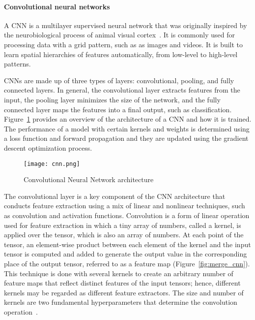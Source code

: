 \paragraph{Convolutional neural networks} 

A \gls{CNN} is a multilayer supervised neural network that was originally inspired by the neurobiological process of animal visual cortex~\cite{Ganatra2018ATools}. It is commonly used for processing data with a grid pattern, such as as images and videos. It is built to learn spatial hierarchies of features automatically, from low-level to high-level patterns. 

\gls{CNN}s are made up of three types of layers: convolutional, pooling, and fully connected layers. In general, the convolutional layer extracts features from the input, the pooling layer minimizes the size of the network, and the fully connected layer maps the features into a final output, such as classification. Figure~\ref{fig:cnn} provides an overview of the architecture of a \gls{CNN} and how it is trained. The performance of a model with certain kernels and weights is determined using a loss function and forward propagation and they are updated using the gradient descent optimization process.

\begin{figure}[htbp]
    \centering
    \texttt{[image: cnn.png]}
    \caption{Convolutional Neural Network architecture~\cite{Yamashita2018ConvolutionalRadiology}}
    \label{fig:cnn}
\end{figure}

The convolutional layer is a key component of the \gls{CNN} architecture that conducts feature extraction using a mix of linear and nonlinear techniques, such as convolution and activation functions. Convolution is a form of linear operation used for feature extraction in which a tiny array of numbers, called a kernel, is applied over the tensor, which is also an array of numbers. At each point of the tensor, an element-wise product between each element of the kernel and the input tensor is computed and added to generate the output value in the corresponding place of the output tensor, referred to as a feature map (Figure~\ref{fig:merge_cnn}). This technique is done with several kernels to create an arbitrary number of feature maps that reflect distinct features of the input tensors; hence, different kernels may be regarded as different feature extractors. The size and number of kernels are two fundamental hyperparameters that determine the convolution operation~\cite{Yamashita2018ConvolutionalRadiology}.


